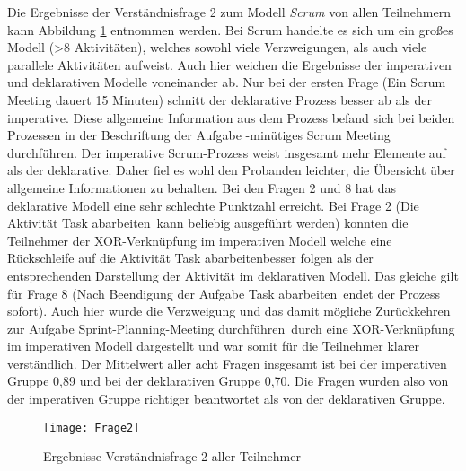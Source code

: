 Die Ergebnisse der Verständnisfrage 2 zum Modell \textit{Scrum} von allen Teilnehmern kann Abbildung \ref{fig:Frage2} entnommen werden.  Bei Scrum handelte es sich um ein großes Modell (>8 Aktivitäten), welches sowohl viele Verzweigungen, als auch viele parallele Aktivitäten aufweist. Auch hier weichen die Ergebnisse der imperativen und deklarativen Modelle voneinander ab.\newline
Nur bei der ersten Frage (\grqq Ein Scrum Meeting dauert 15 Minuten\grqq) schnitt der deklarative Prozess besser ab als der imperative. Diese allgemeine Information aus dem Prozess befand sich bei beiden Prozessen in der Beschriftung der Aufgabe -minütiges Scrum Meeting durchführen\grqq. Der imperative Scrum-Prozess weist insgesamt mehr Elemente auf als der deklarative. Daher fiel es wohl den Probanden leichter, die Übersicht über allgemeine Informationen zu behalten.\newline
Bei den Fragen 2 und 8 hat das deklarative Modell eine sehr schlechte Punktzahl erreicht. Bei Frage 2 (\grqq Die Aktivität \grqq Task abarbeiten\grqq \ kann beliebig ausgeführt werden\grqq) konnten die Teilnehmer der XOR-Verknüpfung im imperativen Modell welche eine Rückschleife auf die Aktivität \grqq Task abarbeiten\grqq besser folgen als der entsprechenden Darstellung der Aktivität im deklarativen Modell. \newline
Das gleiche gilt für Frage 8 (\grqq Nach Beendigung der Aufgabe \grqq Task abarbeiten\grqq \ endet der Prozess sofort\grqq). Auch hier wurde die Verzweigung und das damit mögliche Zurückkehren zur Aufgabe \grqq Sprint-Planning-Meeting durchführen\grqq \ durch eine XOR-Verknüpfung im imperativen Modell dargestellt und war somit für die Teilnehmer klarer verständlich.\newline
Der Mittelwert aller acht Fragen insgesamt ist bei der imperativen Gruppe 0,89 und bei der deklarativen Gruppe 0,70. Die Fragen wurden also von der imperativen Gruppe richtiger beantwortet als von der deklarativen Gruppe.\newline


\begin{figure}[htp]
\begin{center}
  \texttt{[image: Frage2]} %
  \caption{Ergebnisse Verständnisfrage 2 aller Teilnehmer}
  \label{fig:Frage2}
\end{center}
\end{figure}

